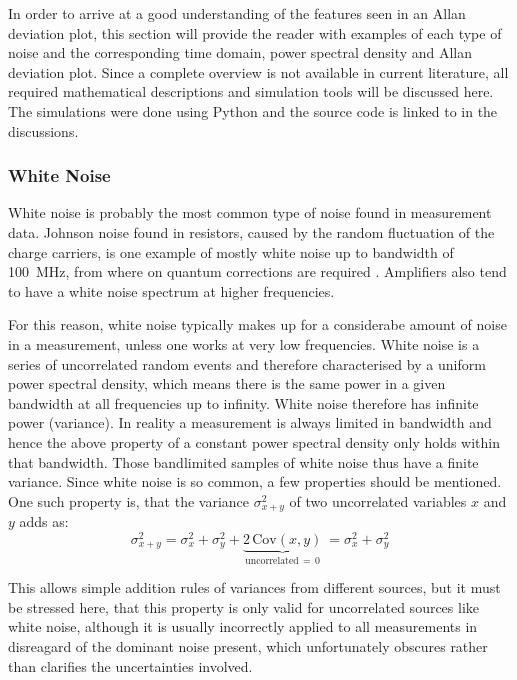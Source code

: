 In order to arrive at a good understanding of the features seen in an Allan deviation plot, this section will provide the reader with examples of each type of noise and the corresponding time domain, power spectral density and Allan deviation plot. Since a complete overview is not available in current literature, all required mathematical descriptions and simulation tools will be discussed here. The simulations were done using Python and the source code is linked to in the discussions.

\clearpage
\subsubsection{White Noise}
White noise is probably the most common type of noise found in measurement data. Johnson noise found in resistors, caused by the random fluctuation of the charge carriers, is one example of mostly white noise up to bandwidth of \qty{100}{\MHz}, from where on quantum corrections are required \cite{nist_johnson_noise}. Amplifiers also tend to have a white noise spectrum at higher frequencies.

For this reason, white noise typically makes up for a considerabe amount of noise in a measurement, unless one works at very low frequencies. White noise is a series of uncorrelated random events and therefore characterised by a uniform power spectral density, which means there is the same power in a given bandwidth at all frequencies up to infinity. White noise therefore has infinite power (variance). In reality a measurement is always limited in bandwidth and hence the above property of a constant power spectral density only holds within that bandwidth. Those bandlimited samples of white noise thus have a finite variance.
Since white noise is so common, a few properties should be mentioned. One such property is, that the variance $\sigma_{x+y}^2$ of two uncorrelated variables $x$ and $y$ adds as:
\begin{equation}
    \sigma_{x+y}^2  = \sigma_x^2 + \sigma_y^2 + \underbrace{2\,\mathrm{Cov}(x,y)}_{\text{uncorrelated}\, =\, 0}\ = \sigma_x^2 + \sigma_y^2 \label{eqn:adding_white_noise}
\end{equation}

This allows simple addition rules of variances from different sources, but it must be stressed here, that this property is only valid for uncorrelated sources like white noise, although it is usually incorrectly applied to all measurements in disreagard of the dominant noise present, which unfortunately obscures rather than clarifies the uncertainties involved.

